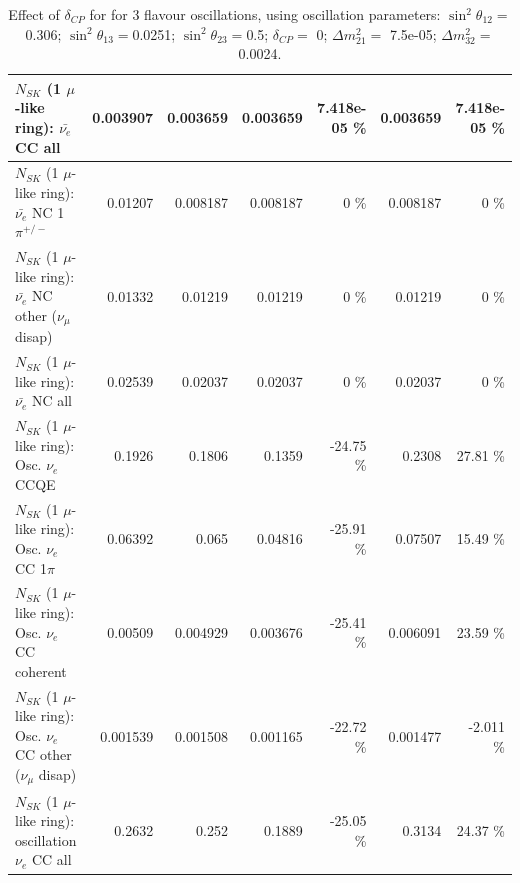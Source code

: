 \begin{table}
\begin{tabular}{| l | r | r | r  r | r  r |}
                            $N_{SK}$ (1 $\mu$-like ring): $\bar{\nu_{e}}$ CC all &        0.003907 &        0.003659 &        0.003659 & 7.418e-05 \%  &        0.003659 & 7.418e-05 \%  \\ 
\hline
                     $N_{SK}$ (1 $\mu$-like ring): $\bar{\nu_e}$ NC 1$\pi^{+/-}$ &         0.01207 &        0.008187 &        0.008187 &        0 \%  &        0.008187 &        0 \%  \\ 
          $N_{SK}$ (1 $\mu$-like ring): $\bar{\nu_e}$ NC other ($\nu_\mu$ disap) &         0.01332 &         0.01219 &         0.01219 &        0 \%  &         0.01219 &        0 \%  \\ 
                            $N_{SK}$ (1 $\mu$-like ring): $\bar{\nu_{e}}$ NC all &         0.02539 &         0.02037 &         0.02037 &        0 \%  &         0.02037 &        0 \%  \\ 
\hline
\hline
\hline
                                 $N_{SK}$ (1 $\mu$-like ring): Osc. $\nu_e$ CCQE &          0.1926 &          0.1806 &          0.1359 &   -24.75 \%  &          0.2308 &    27.81 \%  \\ 
                            $N_{SK}$ (1 $\mu$-like ring): Osc. $\nu_e$ CC 1$\pi$ &         0.06392 &           0.065 &         0.04816 &   -25.91 \%  &         0.07507 &    15.49 \%  \\ 
                          $N_{SK}$ (1 $\mu$-like ring): Osc. $\nu_e$ CC coherent &         0.00509 &        0.004929 &        0.003676 &   -25.41 \%  &        0.006091 &    23.59 \%  \\ 
           $N_{SK}$ (1 $\mu$-like ring): Osc. $\nu_e$ CC other ($\nu_\mu$ disap) &        0.001539 &        0.001508 &        0.001165 &   -22.72 \%  &        0.001477 &   -2.011 \%  \\ 
                        $N_{SK}$ (1 $\mu$-like ring): oscillation $\nu_e$ CC all &          0.2632 &           0.252 &          0.1889 &   -25.05 \%  &          0.3134 &    24.37 \%  \\ 
\hline
\hline
\end{tabular}
\caption{ Effect of $\delta_{CP}$ for for 3 flavour oscillations, using oscillation parameters:  $\sin^2\theta_{12} = $0.306; $\sin^2\theta_{13} = $0.0251; $\sin^2\theta_{23} = $0.5; $\delta_{CP} = $        0; $\Delta m^2_{21} = $    7.5e-05; $\Delta m^2_{32} = $    0.0024. }
\label{tab:num_deltacp_1RmuT_3f_osc_t13:0.0251}
\end{table}
\clearpage
